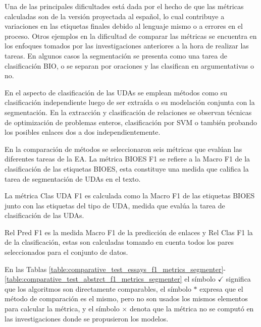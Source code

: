 \documentclass[a4paper,11pt,twocolumn,twoside]{article}
\begin{document}
Una de las principales dificultades está dada por el hecho de que las métricas calculadas son de la versión proyectada
al español, lo cual contribuye a variaciones en las etiquetas finales debido al lenguaje mismo 
o a errores en el proceso. Otros ejemplos en la dificultad de comparar las métricas se encuentra
en los enfoques tomados por las investigaciones anteriores a la hora de realizar las tareas.
En algunos casos la segmentación se presenta como una tarea de clasificación BIO, o
se separan por oraciones y las clasifican en argumentativas o no.

En el aspecto de clasificación
de las UDAs se emplean métodos como su clasificación independiente luego de ser extraída o su modelación
conjunta con la segmentación. En la extracción y clasificación de relaciones se observan técnicas de 
optimización de problemas enteros, clasificación por SVM o también probando los posibles enlaces dos 
a dos independientemente.

En la comparación de métodos se seleccionaron seis métricas que evalúan las diferentes 
tareas de la EA. La métrica BIOES F1 se refiere 
a la Macro F1 de la clasificación de las etiquetas BIOES, esta constituye una medida
que califica la tarea de segmentación de UDAs en el texto. 

La métrica Clas UDA F1 es 
calculada como la Macro F1 de las etiquetas BIOES junto con las etiquetas del tipo de 
UDA, medida que evalúa la tarea de clasificación de las UDAs. 

Rel Pred F1 es la medida 
Macro F1 de la predicción de enlaces y Rel Clas F1 la de la clasificación, estas 
son calculadas tomando en cuenta todos los pares seleccionados para el conjunto de 
datos. 

En las Tablas \ref{table:comparative_test_essays_f1_metrics_segmenter}-\ref{table:comparative_test_abstrct_f1_metrics_segmenter} el símbolo $\checkmark$ significa 
que los algoritmos son directamente comparables, el símbolo
$*$ expresa que el método de comparación es el mismo, pero no son usados los mismos 
elementos para calcular la métrica, y el símbolo $\times$ denota que la métrica no 
se computó en las investigaciones donde se propusieron los modelos.
\end{document}
